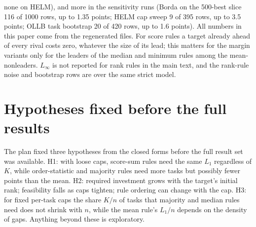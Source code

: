 \documentclass{article}
\begin{document}
none on HELM), and more in the sensitivity runs (Borda on the 500-best slice 116 of 1000 rows, up to 1.35 points; HELM cap sweep 9 of 395 rows, up to 3.5 points; OLLB task bootstrap 20 of 420 rows, up to 1.6 points). All numbers in this paper come from the regenerated files. For score rules a target already ahead of every rival costs zero, whatever the size of its lead; this matters for the margin variants only for the leaders of the median and minimum rules among the mean-nonleaders. $L_\infty$ is not reported for rank rules in the main text, and the rank-rule noise and bootstrap rows are over the same strict model.

\section{Hypotheses fixed before the full results}
\label{app:hyp}
The plan fixed three hypotheses from the closed forms before the full result set was available. H1: with loose caps, score-sum rules need the same $L_1$ regardless of $K$, while order-statistic and majority rules need more tasks but possibly fewer points than the mean. H2: required investment grows with the target's initial rank; feasibility falls as caps tighten; rule ordering can change with the cap. H3: for fixed per-task caps the share $K/n$ of tasks that majority and median rules need does not shrink with $n$, while the mean rule's $L_1/n$ depends on the density of gaps. Anything beyond these is exploratory.

\clearpage

\end{document}
